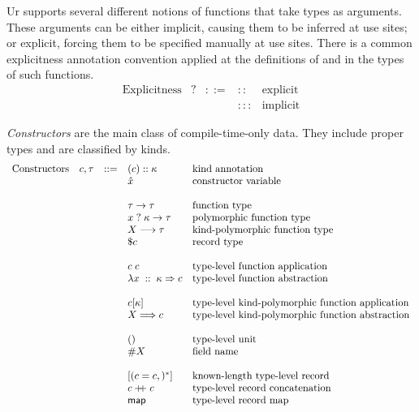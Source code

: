 \documentclass{article}
\newcommand{\mt}[1]{\mathsf{#1}}
\newcommand{\rc}{+ \hspace{-.075in} + \;}
\begin{document}
Ur supports several different notions of functions that take types as arguments.  These arguments can be either implicit, causing them to be inferred at use sites; or explicit, forcing them to be specified manually at use sites.  There is a common explicitness annotation convention applied at the definitions of and in the types of such functions.
$$\begin{array}{rrcll}
  \textrm{Explicitness} & ? &::=& :: & \textrm{explicit} \\
  &&& ::: & \textrm{implicit}
\end{array}$$

\emph{Constructors} are the main class of compile-time-only data.  They include proper types and are classified by kinds.
$$\begin{array}{rrcll}
  \textrm{Constructors} & c, \tau &::=& (c) :: \kappa & \textrm{kind annotation} \\
  &&& \hat{x} & \textrm{constructor variable} \\
  \\
  &&& \tau \to \tau & \textrm{function type} \\
  &&& x \; ? \; \kappa \to \tau & \textrm{polymorphic function type} \\
  &&& X \longrightarrow \tau & \textrm{kind-polymorphic function type} \\
  &&& \$ c & \textrm{record type} \\
  \\
  &&& c \; c & \textrm{type-level function application} \\
  &&& \lambda x \; :: \; \kappa \Rightarrow c & \textrm{type-level function abstraction} \\
  \\
  &&& c [\kappa] & \textrm{type-level kind-polymorphic function application} \\
  &&& X \Longrightarrow c & \textrm{type-level kind-polymorphic function abstraction} \\
  \\
  &&& () & \textrm{type-level unit} \\
  &&& \#X & \textrm{field name} \\
  \\
  &&& [(c = c,)^*] & \textrm{known-length type-level record} \\
  &&& c \rc c & \textrm{type-level record concatenation} \\
  &&& \mt{map} & \textrm{type-level record map} \\
  \\

\end{array}$$
\end{document}

